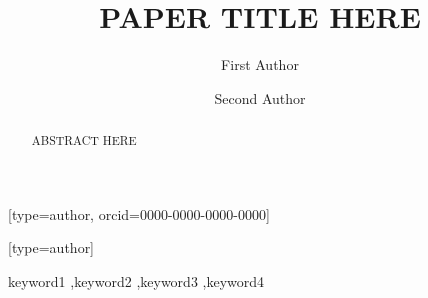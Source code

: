\documentclass[a4paper,fleqn]{cas-dc}
\begin{document}
\let\WriteBookmarks\relax
\def\floatpagepagefraction{1}
\def\textpagefraction{.001}


\title[mode=title]{PAPER TITLE HERE}

\author[1]{First Author}[type=author,
  orcid=0000-0000-0000-0000]
\cormark[1]
\fnmark[1]

\author[2]{Second Author}[type=author]

\address[1]{Department, University, City, Country}
\address[2]{Department, University, City, Country}


\begin{abstract}
ABSTRACT HERE
\end{abstract}

\begin{keywords}
keyword1 \sep keyword2 \sep keyword3 \sep keyword4
\end{keywords}

\maketitle







% 



\end{document}
